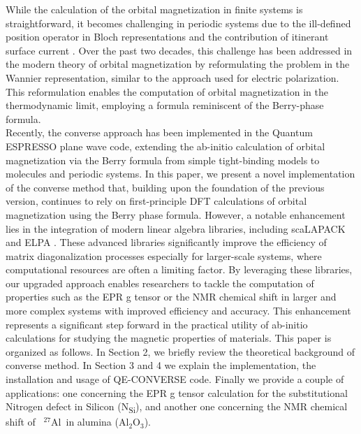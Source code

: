 \documentclass[final,3p,times,twocolumn]{elsarticle}
\begin{document}
\begin{small}
While the calculation of the orbital magnetization in finite systems is straightforward, it becomes challenging in periodic systems due to the ill-defined position operator in Bloch representations and the contribution of itinerant surface current \cite{Resta_2010,PhysRevB.74.024408}. Over the past two decades, this challenge has been addressed in the modern theory of orbital magnetization \cite{PhysRevLett.95.137204,PhysRevLett.95.137205} by reformulating the problem in the Wannier representation, similar to the approach used for electric polarization. This reformulation enables the computation of orbital magnetization in the thermodynamic limit, employing a formula reminiscent of the Berry-phase formula. \\  Recently, the converse approach has been implemented \cite{PhysRevB.81.060409} in the Quantum ESPRESSO \cite{Giannozzi2017} plane wave code, extending the ab-initio calculation of orbital magnetization via the Berry formula \cite{PhysRevB.74.024408} from simple tight-binding models to molecules and periodic systems. In this paper, we present a novel implementation of the converse method that, building upon the foundation of the previous version, continues to rely on first-principle DFT calculations of orbital magnetization using the Berry phase formula. However, a notable enhancement lies in the integration of modern linear algebra libraries, including scaLAPACK \cite{slug} and ELPA \cite{Marek_2014}. 
These advanced libraries significantly improve the efficiency of matrix diagonalization processes especially for larger-scale systems, where computational resources are often a limiting factor. By leveraging these libraries, our upgraded approach enables researchers to tackle the computation of properties such as the EPR g tensor or the NMR chemical shift in larger and more complex systems with improved efficiency and accuracy. This enhancement represents a significant step forward in the practical utility of ab-initio calculations for studying the magnetic properties of materials. This paper is organized as follows. In Section 2, we briefly review the theoretical background of converse method. In Section 3 and 4 we explain the implementation, the installation and usage of {\selectfont
QE-CONVERSE} code. Finally we provide a couple of applications: one concerning the EPR g tensor calculation for the substitutional Nitrogen defect in Silicon (N\textsubscript{Si}), and another one concerning the NMR chemical shift of \ ${}^{27}$Al\ in alumina ($\mathrm{Al_{2}O_{3}}$). \\
\vskip0.5cm

\end{small}
\end{document}
